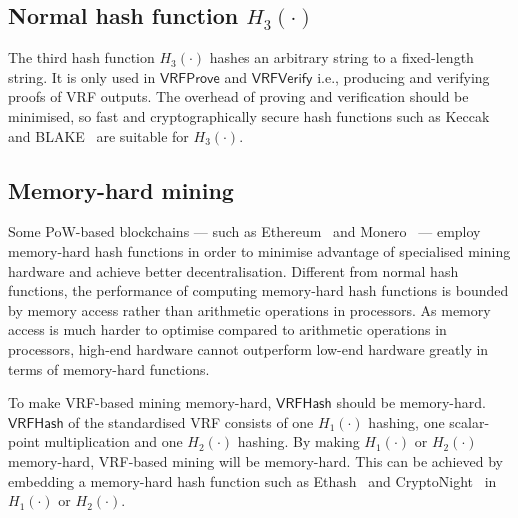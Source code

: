 \subsection{Normal hash function $H_{3}(\cdot)$}
The third hash function $H_{3}(\cdot)$ hashes an arbitrary string to a fixed-length string.
It is only used in $\mathsf{VRFProve}$ and $\mathsf{VRFVerify}$ i.e., producing and verifying proofs of VRF outputs.
The overhead of proving and verification should be minimised, so fast and cryptographically secure hash functions such as Keccak~\cite{bertoni2013keccak} and BLAKE~\cite{aumasson2008sha} are suitable for $H_{3}(\cdot)$.


\subsection{Memory-hard mining}
Some PoW-based blockchains --- such as Ethereum~\cite{wood2014ethereum} and Monero~\cite{monero} --- employ memory-hard hash functions in order to minimise advantage of specialised mining hardware and achieve better decentralisation.
Different from normal hash functions, the performance of computing memory-hard hash functions is bounded by memory access rather than arithmetic operations in processors.
As memory access is much harder to optimise compared to arithmetic operations in processors, high-end hardware cannot outperform low-end hardware greatly in terms of memory-hard functions.

To make VRF-based mining memory-hard, $\mathsf{VRFHash}$ should be memory-hard.
$\mathsf{VRFHash}$ of the standardised VRF consists of one $H_{1}(\cdot)$ hashing, one scalar-point multiplication and one $H_{2}(\cdot)$ hashing.
By making $H_{1}(\cdot)$ or $H_{2}(\cdot)$ memory-hard, VRF-based mining will be memory-hard.
This can be achieved by embedding a memory-hard hash function such as Ethash~\cite{wiki2017ethash} and CryptoNight~\cite{seigenneocortex} in $H_1(\cdot)$ or $H_2(\cdot)$.